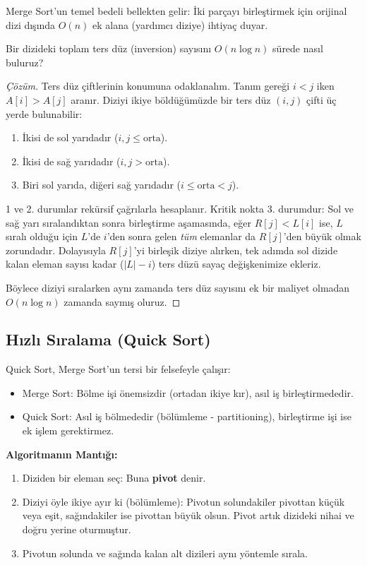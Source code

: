 Merge Sort'un temel bedeli bellekten gelir: İki parçayı birleştirmek için orijinal dizi dışında $O(n)$ ek alana (yardımcı diziye) ihtiyaç duyar.

\begin{example}
Bir dizideki toplam ters düz (inversion) sayısını $O(n \log n)$ sürede nasıl buluruz?
\end{example}

\begin{proof}[Çözüm]
Ters düz çiftlerinin konumuna odaklanalım. Tanım gereği $i < j$ iken $A[i] > A[j]$ aranır. Diziyi ikiye böldüğümüzde bir ters düz $(i, j)$ çifti üç yerde bulunabilir:
\begin{enumerate}
    \item İkisi de sol yarıdadır ($i, j \le \text{orta}$).
    \item İkisi de sağ yarıdadır ($i, j > \text{orta}$).
    \item Biri sol yarıda, diğeri sağ yarıdadır ($i \le \text{orta} < j$).
\end{enumerate}
1 ve 2. durumlar rekürsif çağrılarla hesaplanır. Kritik nokta 3. durumdur: Sol ve sağ yarı sıralandıktan sonra birleştirme aşamasında, eğer $R[j] < L[i]$ ise, $L$ sıralı olduğu için $L$'de $i$'den sonra gelen \emph{tüm} elemanlar da $R[j]$'den büyük olmak zorundadır.
Dolayısıyla $R[j]$'yi birleşik diziye alırken, tek adımda sol dizide kalan eleman sayısı kadar ($|L| - i$) ters düzü sayaç değişkenimize ekleriz.

Böylece diziyi sıralarken aynı zamanda ters düz sayısını ek bir maliyet olmadan $O(n \log n)$ zamanda saymış oluruz.
\end{proof}

\subsection{Hızlı Sıralama (Quick Sort)}

Quick Sort, Merge Sort'un tersi bir felsefeyle çalışır:
\begin{itemize}
    \item Merge Sort: Bölme işi önemsizdir (ortadan ikiye kır), asıl iş birleştirmededir.
    \item Quick Sort: Asıl iş bölmededir (bölümleme - partitioning), birleştirme işi ise ek işlem gerektirmez.
\end{itemize}

\textbf{Algoritmanın Mantığı:}
\begin{enumerate}
    \item Diziden bir eleman seç: Buna \textbf{pivot} denir.
    \item Diziyi öyle ikiye ayır ki (bölümleme): Pivotun solundakiler pivottan küçük veya eşit, sağındakiler ise pivottan büyük olsun. Pivot artık dizideki nihai ve doğru yerine oturmuştur.
    \item Pivotun solunda ve sağında kalan alt dizileri aynı yöntemle sırala.
\end{enumerate}

